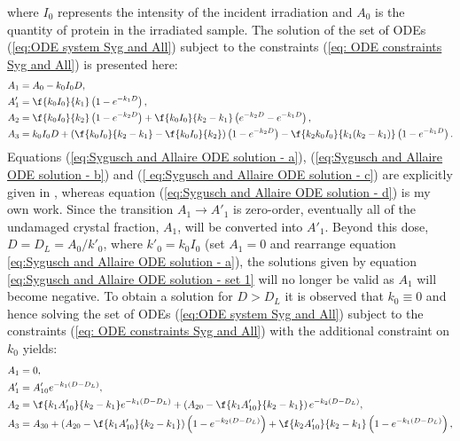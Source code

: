 where $I_0$ represents the intensity of the incident irradiation and $A_0$ is the quantity of protein in the irradiated sample.
\newline
The solution of the set of ODEs (\ref{eq:ODE system Syg and All}) subject to the constraints (\ref{eq: ODE constraints Syg and All}) is presented here:
\begin{subequations}
\begin{align}
A_1  &= A_0 - k_0 I_0 D, \label{eq:Sygusch and Allaire ODE solution - a}\\
A'_1 &= \f{k_0 I_0}{k_1} \left( 1 - e^{-k_1 D}\right), \label{eq:Sygusch and Allaire ODE solution - b}\\
A_2  &= \f{k_0 I_0}{k_2} \left( 1 - e^{-k_2 D}\right) + \f{k_0 I_0}{k_2 - k_1} \left(e^{-k_2 D} - e^{-k_1 D}\right), \label{
eq:Sygusch and Allaire ODE solution - c}\\
A_3  &= k_0 I_0 D + \left(\f{k_0 I_0}{k_2 - k_1} - \f{k_0 I_0}{k_2}\right)\left( 1 - e^{-k_2 D}\right) - \f{k_2 k_0 I_0}{k_1(k_2 - k_1)}\left(1 - e^{-k_1 D} \right) \label{eq:Sygusch and Allaire ODE solution - d}.
\end{align}
\label{eq:Sygusch and Allaire ODE solution - set 1}
\end{subequations}
Equations (\ref{eq:Sygusch and Allaire ODE solution - a}), (\ref{eq:Sygusch and Allaire ODE solution - b}) and (\ref{
eq:Sygusch and Allaire ODE solution - c}) are explicitly given in \cite{sygusch1988}, whereas equation (\ref{eq:Sygusch and Allaire ODE solution - d}) is my own work.
Since the transition $A_1 \rightarrow A'_1$ is zero-order, eventually all of the undamaged crystal fraction, $A_1$, will be converted into $A'_1$.
Beyond this dose, $D = D_L = A_0/k'_0$, where $k'_0 = k_0 I_0$ (set $A_1 = 0$ and rearrange equation \ref{eq:Sygusch and Allaire ODE solution - a}), the solutions given by equation \ref{eq:Sygusch and Allaire ODE solution - set 1} will no longer be valid as $A_1$ will become negative.
To obtain a solution for $D > D_L$ it is observed that $k_0 \equiv 0$ and hence solving the set of ODEs (\ref{eq:ODE system Syg and All}) subject to the constraints (\ref{eq: ODE constraints Syg and All}) with the additional constraint on $k_0$ yields:
\begin{subequations}
\begin{align}
A_1  &= 0, \\
A'_1 &= A'_{10} e^{-k_1 (D - D_L)}, \\
A_2  &= \f{k_1 A'_{10}}{k_2 - k_1} e^{-k_1 (D - D_L)} + \left(A_{20} - \f{k_1 A'_{10}}{k_2 - k_1} \right) e^{-k_2 (D - D_L)}, \\
A_3  &= A_{30} + \left(A_{20} - \f{k_1 A'_{10}}{k_2 - k_1}\right) \left(1 - e^{-k_2(D-D_L)}\right) + \f{k_2 A'_{10}}{k_2 - k_1} \left(1 - e^{-k_1 (D - D_L)}\right),
\end{align}
\label{eq:Sygusch and Allaire ODE solution - set 2}
\end{subequations}
